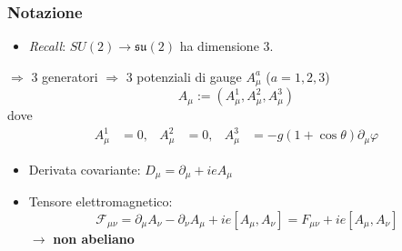 \begin{frame}\frametitle{Notazione}

\begin{itemize}
   \item \emph{Recall}: $SU(2) \to \mathfrak{su(2)}$ ha dimensione 3.
\end{itemize}

$\Rightarrow $ 3 generatori $\Rightarrow $ 3 potenziali di gauge $A_\mu^a$ ($a = 1,2,3$)\\
$$ A _\mu := (A_\mu^1,A_\mu^2,A_\mu^3) $$
dove
\begin{equation*}
\begin{aligned}
   A_\mu^1 &= 0, & A_\mu^2 &= 0, & A_\mu^3 &= -g(1 + \cos\theta) \partial_\mu \varphi
\end{aligned}
\end{equation*}

\begin{itemize}
   \item Derivata covariante: $D _\mu = \partial _\mu + ie A_\mu$
   \item Tensore elettromagnetico:
      $$\mathcal{F}_{\mu\nu} = \partial _\mu A_\nu - \partial _\nu A_\mu
                              + ie [A_\mu,A_\nu]
                              = F_{\mu\nu} + ie [A_\mu,A_\nu]$$
      $\to$ \textbf{non abeliano}
\end{itemize}

\end{frame}

